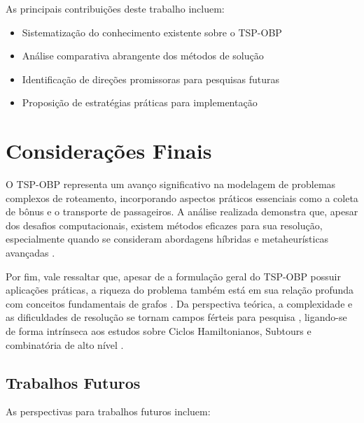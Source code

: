\documentclass[12pt, a4paper]{report}
\begin{document}
As principais contribuições deste trabalho incluem:

\begin{itemize}
    \item Sistematização do conhecimento existente sobre o TSP-OBP
    \item Análise comparativa abrangente dos métodos de solução
    \item Identificação de direções promissoras para pesquisas futuras
    \item Proposição de estratégias práticas para implementação
\end{itemize}

\section{Considerações Finais}

O TSP-OBP representa um avanço significativo na modelagem de problemas complexos de roteamento, incorporando aspectos práticos essenciais como a coleta de bônus e o transporte de passageiros. A análise realizada demonstra que, apesar dos desafios computacionais, existem métodos eficazes para sua resolução, especialmente quando se consideram abordagens híbridas e metaheurísticas avançadas \cite{lopesfilho2019, carvalho2022}.

Por fim, vale ressaltar que, apesar de a formulação geral do TSP-OBP possuir aplicações práticas, a riqueza do problema também está em sua relação profunda com conceitos fundamentais de grafos \cite{gomes2016, gomes2018}. Da perspectiva teórica, a complexidade e as dificuldades de resolução se tornam campos férteis para pesquisa \cite{salvador, machado}, ligando-se de forma intrínseca aos estudos sobre Ciclos Hamiltonianos, Subtours e combinatória de alto nível \cite{ramos, carnielli}.

\subsection*{Trabalhos Futuros}

As perspectivas para trabalhos futuros incluem:
\end{document}
